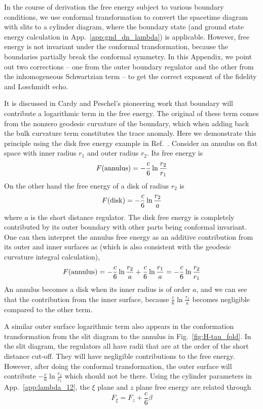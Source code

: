 
In the course of derivation the free energy subject to various boundary conditions, we use conformal transformation to convert the spacetime diagram with slits to a cylinder diagram, where the boundary state (and ground state energy calculation in App.~\ref{app:gnd_dn_lambda}) is applicable. However, free energy is not invariant under the conformal transformation, because the boundaries partially break the conformal symmetry. In this Appendix, we point out two corrections -- one from the outer boundary regulator and the other from the inhomogeneous Schwartzian term -- to get the correct exponent of the fidelity and Loschmidt echo. 

It is discussed in Cardy and Peschel's pioneering work\cite{cardy_finite-size_1988} that boundary will contribute a logarithmic term in the free energy. The original of these term comes from the nonzero geodesic curvature of the boundary, which when adding back the bulk curvature term constitutes the trace anomaly. Here we demonstrate this principle using the disk free energy example in Ref.~. Consider an annulus on flat space with inner radius $r_1$ and outer radius $r_2$. Its free energy is
\begin{equation}
F({\rm annulus}) = -  \frac{c}{6} \ln \frac{r_2}{r_1} 
\end{equation}
On the other hand the free energy of a disk of radius $r_2$ is
\begin{equation}
  F( {\rm disk} ) = - \frac{c}{6} \ln \frac{r_2}{a}
\end{equation}
where $a$ is the short distance regulator. The disk free energy is completely contributed by its outer boundary with other parts being conformal invariant. One can then interpret the annulus free energy as an additive contribution from its outer and inner surfaces as (which is also consistent with the geodesic curvature integral calculation),
\begin{equation}
F( {\rm annulus} ) = -  \frac{c}{6} \ln \frac{r_2}{a} +  \frac{c}{6} \ln \frac{r_1}{a} = - \frac{c}{6} \ln \frac{r_2}{r_1}
\end{equation}
An annulus becomes a disk when its inner radius is of order $a$, and we can see that the contribution from the inner surface, because $\frac{c}{6} \ln \frac{r_1}{a}$ becomes negligible compared to the other term.  

A similar outer surface logarithmic term also appears in the conformation transformation from the slit diagram to the annulus in Fig.~\ref{fig:H-tau_fold}. In the slit diagram, the regulators all have radii that are at the order of the short distance cut-off. They will have negligible contributions to the free energy. However, after doing the conformal transformation, the outer surface will contribute $-\frac{c}{6} \ln \frac{r_2}{r_1}$ which should not be there. Using the cylinder parameters in App.~\ref{app:lambda_12}, the $\xi$ plane and $z$ plane free energy are related through
\begin{equation}
F_{\xi } = F_{z} + \frac{c}{6} \beta 
\end{equation}

